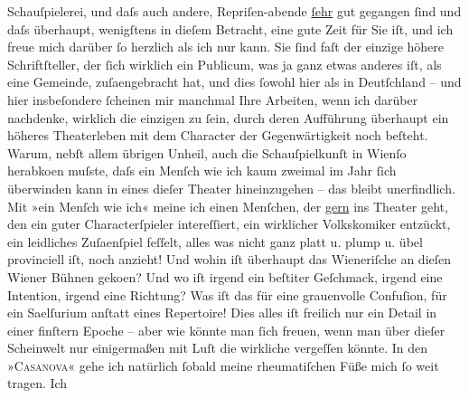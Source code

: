 \begin{ledgroupsized}[t]{13cm}
               Schauſpielerei, und daſs auch andere, Repriſen-abende \uline{ſehr} gut gegangen ſind und daſs überhaupt, wenigſtens in dieſem Betracht,
               eine gute Zeit für Sie iſt, und ich freue mich darüber ſo herzlich als ich nur kann.
               Sie ſind faſt der einzige höhere Schriftſteller, der ſich wirklich ein Publicum, was
               ja ganz etwas anderes {\pb}iſt, als
               eine Gemeinde, zuſa{\geminationm}engebracht hat, und dies ſowohl hier
               als in Deutſchland – und hier insbeſondere ſcheinen
               mir manchmal Ihre Arbeiten, wenn ich darüber nachdenke, wirklich die einzigen zu
               ſein, durch deren Aufführung überhaupt ein höheres Theaterleben mit dem Character der
               Gegenwärtigkeit noch beſteht.\pend
           \pstart
           Warum, nebſt allem übrigen Unheil, auch die Schauſpielkunſt in Wienſo herabko{\geminationm}en muſste,
               daſs ein Menſch wie ich kaum zweimal {\pb}im Jahr ſich überwinden kann in
               eines dieſer Theater hineinzugehen – das bleibt unerfindlich. Mit »ein Menſch wie
               ich« meine ich einen Menſchen, der \uline{gern} ins Theater
               geht, den ein guter Characterſpieler intereſſiert, ein wirklicher Volkskomiker
               entzückt, ein leidliches Zuſa{\geminationm}enſpiel feſſelt, alles was
               nicht ganz platt u. plump u. übel provinciell iſt, noch anzieht! Und wohin iſt
               überhaupt das Wieneriſche an dieſen Wiener Bühnen geko{\geminationm}en? Und wo iſt
               irgend ein beſti{\geminationm}ter Geſchmack, {\pb}irgend eine Intention, irgend eine
               Richtung? Was iſt das für eine grauenvolle Confuſion, für ein Sa{\geminationm}elſurium anſtatt eines Repertoire! Dies alles iſt
               freilich nur ein Detail in einer finſtern Epoche – aber wie könnte man ſich freuen,
               wenn man über dieſer Scheinwelt nur einigermaßen mit Luſt die wirkliche vergeſſen
               könnte.\pend
           \pstart
           In den »\textsc{Casanova}« gehe ich natürlich ſobald meine rheumatiſchen Füße mich ſo weit tragen. Ich

\end{ledgroupsized}

